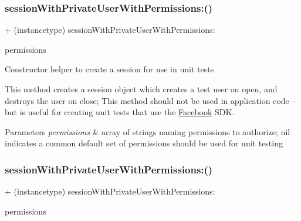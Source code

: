 \subsubsection{\texorpdfstring{session\+With\+Private\+User\+With\+Permissions\+:()}{sessionWithPrivateUserWithPermissions:()}\hspace{0.1cm}{\footnotesize\ttfamily [4/5]}}
{\footnotesize\ttfamily + (instancetype) session\+With\+Private\+User\+With\+Permissions\+: \begin{DoxyParamCaption}\item[{(N\+S\+Array $\ast$)}]{permissions }\end{DoxyParamCaption}}

Constructor helper to create a session for use in unit tests

This method creates a session object which creates a test user on open, and destroys the user on close; This method should not be used in application code -- but is useful for creating unit tests that use the \hyperlink{interfaceFacebook}{Facebook} S\+DK.


\begin{DoxyParams}{Parameters}
{\em permissions} & array of strings naming permissions to authorize; nil indicates a common default set of permissions should be used for unit testing \\
\hline
\end{DoxyParams}
\mbox{\label{interfaceFBTestSession_a435c3fc5a918dc5d0a4cfb05cf95e454}} 
\subsubsection{\texorpdfstring{session\+With\+Private\+User\+With\+Permissions\+:()}{sessionWithPrivateUserWithPermissions:()}\hspace{0.1cm}{\footnotesize\ttfamily [5/5]}}
{\footnotesize\ttfamily + (instancetype) session\+With\+Private\+User\+With\+Permissions\+: \begin{DoxyParamCaption}\item[{(N\+S\+Array $\ast$)}]{permissions }\end{DoxyParamCaption}}

